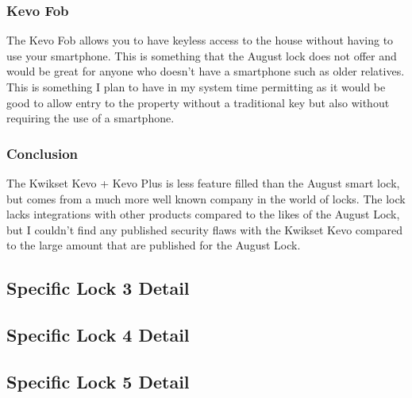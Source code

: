 \subsubsection{Kevo Fob}
The Kevo Fob allows you to have keyless access to the house without having to use your smartphone. This is something that the August lock does not offer and would be great for anyone who doesn't have a smartphone such as older relatives. This is something I plan to have in my system time permitting as it would be good to allow entry to the property without a traditional key but also without requiring the use of a smartphone.


\subsubsection{Conclusion}
The Kwikset Kevo + Kevo Plus is less feature filled than the August smart lock, but comes from a much more well known company in the world of locks. The lock lacks integrations with other products compared to the likes of the August Lock, but I couldn't find any published security flaws with the Kwikset Kevo compared to the large amount that are published for the August Lock.

\subsection{Specific Lock 3 Detail}

\subsection{Specific Lock 4 Detail}

\subsection{Specific Lock 5 Detail}

